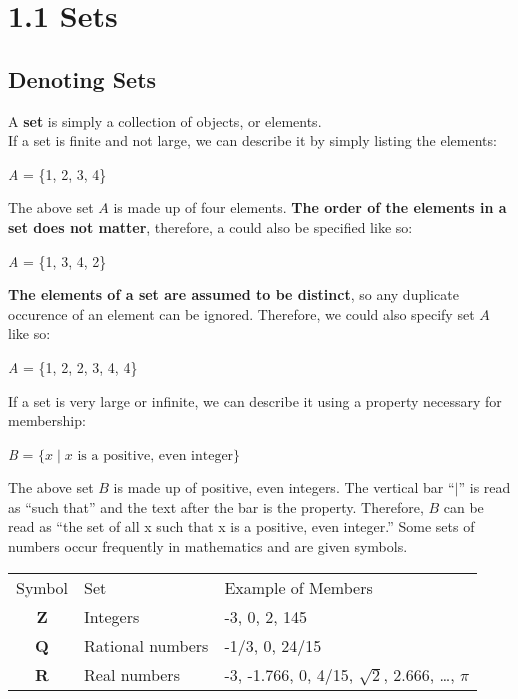\section*{1.1 Sets}

\subsection*{Denoting Sets}

A \textbf{set} is simply a collection of objects, or elements.\\
If a set is finite and not large, we can describe it by simply listing the elements:

\begin{center}
\textit{A} = \{1, 2, 3, 4\}
\end{center}


The above set $A$ is made up of four elements.  \textbf{The order of the elements in a set does not matter}, therefore, a could also be specified like so:

\begin{center}
\textit{A} = \{1, 3, 4, 2\}
\end{center}

\textbf{The elements of a set are assumed to be distinct}, so any duplicate occurence of an element can be ignored.  Therefore, we could also specify set $A$ like so:

\begin{center}
\textit{A} = \{1, 2, 2, 3, 4, 4\}
\end{center}


If a set is very large or infinite, we can describe it using a property necessary for membership:

\begin{center}
\textit{B} = $\{x \mid x \text{ is a positive, even integer}\}$
\end{center}

The above set $B$ is made up of positive, even integers.  The vertical bar ``$\mid$'' is read as ``such that'' and the text after the bar is the property.  Therefore, $B$ can be read as ``the set of all x such that x is a positive, even integer.''
Some sets of numbers occur frequently in mathematics and are given symbols.

\begin{table}[]
\begin{tabular}{cll}
\multicolumn{1}{l}{Symbol} & Set              & Example of Members         \\
\textbf{Z}                 & Integers         & -3, 0, 2, 145              \\
\textbf{Q}                 & Rational numbers & -1/3, 0, 24/15             \\
\textbf{R}                 & Real numbers     & -3, -1.766, 0, 4/15, $\sqrt{2}$, 2.666, \dots, $\pi$
\end{tabular}
\end{table}

